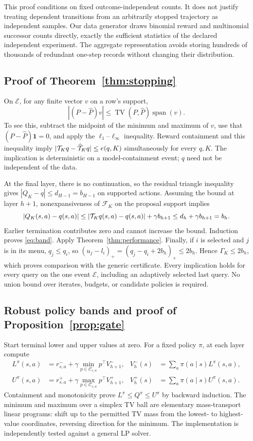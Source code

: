 \documentclass[11pt]{article}
\newcommand{\TV}{\operatorname{TV}}\newcommand{\spn}{\operatorname{span}}
\newcommand{\cF}{\mathcal F}\newcommand{\cC}{\mathcal C}
\begin{document}
This proof conditions on fixed outcome-independent counts. It does not justify treating dependent transitions from an arbitrarily stopped trajectory as independent samples. Our data generator draws binomial reward and multinomial successor counts directly, exactly the sufficient statistics of the declared independent experiment. The aggregate representation avoids storing hundreds of thousands of redundant one-step records without changing their distribution.

\subsection{Proof of Theorem~\ref{thm:stopping}}
On $\mathcal E$, for any finite vector $v$ on a row's support,
\[
 |(P-\widehat P)v|\le \TV(P,\widehat P)\spn(v).
\]
To see this, subtract the midpoint of the minimum and maximum of $v$, use that $(P-\widehat P)\mathbf1=0$, and apply the $\ell_1$--$\ell_\infty$ inequality. Reward containment and this inequality imply
$|\mathcal T_Kq-\widehat{\mathcal T}_Kq|\le e(q,K)$ simultaneously for every $q,K$. The implication is deterministic on a model-containment event; $q$ need not be independent of the data.

At the final layer, there is no continuation, so the residual triangle inequality gives $|Q_K-q|\le d_{H-1}=b_{H-1}$ on supported actions. Assuming the bound at layer $h+1$, nonexpansiveness of $\cF_K$ on the proposal support implies
\[
 |Q_K(s,a)-q(s,a)|
 \le |\mathcal T_Kq(s,a)-q(s,a)|+\gamma b_{h+1}
 \le d_h+\gamma b_{h+1}=b_h.
\]
Earlier termination contributes zero and cannot increase the bound. Induction proves \eqref{eq:band}. Apply Theorem~\ref{thm:performance}. Finally, if $i$ is selected and $j$ is in its menu, $q_j\le q_i$, so
$(u_j-l_i)_+=(q_j-q_i+2b_h)_+\le2b_h$.
Hence $\Gamma_K\le2b_h$, which proves comparison with the generic certificate. Every implication holds for every query on the one event $\mathcal E$, including an adaptively selected last query. No union bound over iterates, budgets, or candidate policies is required.

\subsection{Robust policy bands and proof of Proposition~\ref{prop:gate}}
Start terminal lower and upper values at zero. For a fixed policy $\pi$, at each layer compute
\begin{align*}
 L^\pi(s,a)&=r^-_{s,a}+\gamma\min_{p\in\cC_{s,a}}p^\top V^-_{h+1},&
 V^-_h(s)&=\sum_a\pi(a\mid s)L^\pi(s,a),\\
 U^\pi(s,a)&=r^+_{s,a}+\gamma\max_{p\in\cC_{s,a}}p^\top V^+_{h+1},&
 V^+_h(s)&=\sum_a\pi(a\mid s)U^\pi(s,a).
\end{align*}
Containment and monotonicity prove $L^\pi\le Q^\pi\le U^\pi$ by backward induction. The minimum and maximum over a simplex TV ball are elementary mass-transport linear programs: shift up to the permitted TV mass from the lowest- to highest-value coordinates, reversing direction for the minimum. The implementation is independently tested against a general LP solver.
\end{document}
